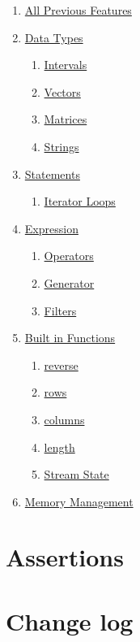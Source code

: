 \documentclass{article}
\begin{document}
  \begin{enumerate}[label*=\arabic*]
    \item \hyperref[sec:part1]{All Previous Features}
    \item \hyperref[sec:types]{Data Types}
    \begin{enumerate}[label*=.\arabic*]
      \item \hyperref[sec:interval]{Intervals}
      \item \hyperref[sec:vector]{Vectors}
      \item \hyperref[sec:matrix]{Matrices}
      \item \hyperref[sec:string]{Strings}
    \end{enumerate}
    \item \hyperref[sec:statements]{Statements}
    \begin{enumerate}[label*=.\arabic*]
      \item \hyperref[sec:iteratorLoop]{Iterator Loops}
    \end{enumerate}
    \item \hyperref[sec:expressions]{Expression}
    \begin{enumerate}[label*=.\arabic*]
      \item \hyperref[sec:operators]{Operators}
      \item \hyperref[sec:generators]{Generator}
      \item \hyperref[sec:filters]{Filters}
    \end{enumerate}
    \item \hyperref[sec:builtIn]{Built in Functions}
    \begin{enumerate}[label*=.\arabic*]
      \item \hyperref[sec:reverse]{reverse}
      \item \hyperref[sec:rowsColumns]{rows}
      \item \hyperref[sec:rowsColumns]{columns}
      \item \hyperref[sec:length]{length}
      \item \hyperref[sec:streamState]{Stream State}
    \end{enumerate}
    \item \hyperref[sec:memory]{Memory Management}
  \end{enumerate}

\section{Assertions}
\label{sec:assertions}


\section{Change log}
\label{sec:changelog}

\end{document}
